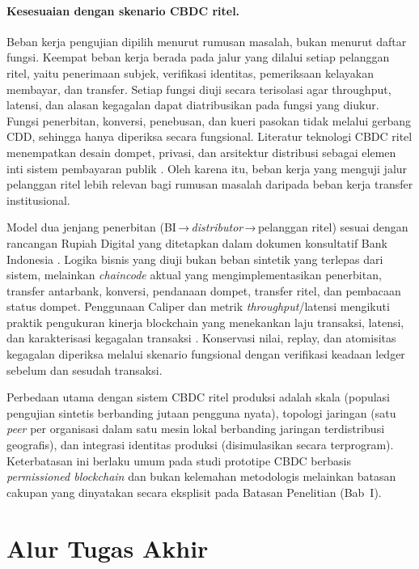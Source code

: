 \paragraph{Kesesuaian dengan skenario CBDC ritel.}
Beban kerja pengujian dipilih menurut rumusan masalah, bukan menurut daftar
fungsi. Keempat beban kerja berada pada jalur yang dilalui setiap pelanggan
ritel, yaitu penerimaan subjek, verifikasi identitas, pemeriksaan kelayakan
membayar, dan transfer. Setiap fungsi diuji secara terisolasi agar throughput,
latensi, dan alasan kegagalan dapat diatribusikan pada fungsi yang diukur.
Fungsi penerbitan, konversi, penebusan, dan kueri pasokan tidak melalui
gerbang CDD, sehingga hanya diperiksa secara fungsional. Literatur teknologi
CBDC ritel menempatkan desain dompet, privasi, dan arsitektur distribusi
sebagai elemen inti sistem pembayaran publik \cite{Auer2020The}. Oleh karena
itu, beban kerja yang menguji jalur pelanggan ritel lebih relevan bagi rumusan
masalah daripada beban kerja transfer institusional.

Model dua jenjang penerbitan (BI\,→\,\textit{distributor}\,→\,pelanggan ritel) sesuai
dengan rancangan Rupiah Digital yang ditetapkan dalam dokumen konsultatif Bank
Indonesia \cite{bi_consultative, bi_garuda_poc}. Logika bisnis yang diuji bukan
beban sintetik yang terlepas dari sistem, melainkan \textit{chaincode} aktual
yang mengimplementasikan penerbitan, transfer antarbank, konversi, pendanaan dompet, transfer ritel, dan pembacaan
status dompet.
Penggunaan Caliper dan metrik \textit{throughput}/latensi mengikuti praktik
pengukuran kinerja blockchain yang menekankan laju transaksi, latensi, dan
karakterisasi kegagalan transaksi \cite{hlf_caliper, hlf_metrics,
fabric_perf2023}. Konservasi nilai, replay, dan atomisitas kegagalan diperiksa
melalui skenario fungsional dengan verifikasi keadaan ledger sebelum dan
sesudah transaksi.

Perbedaan utama dengan sistem CBDC ritel produksi adalah skala (populasi
pengujian sintetis berbanding jutaan pengguna nyata), topologi jaringan (satu
\textit{peer} per organisasi dalam satu mesin lokal berbanding jaringan
terdistribusi geografis), dan integrasi identitas produksi (disimulasikan
secara terprogram). Keterbatasan ini berlaku umum pada studi prototipe CBDC berbasis
\textit{permissioned blockchain} \cite{sethaput2025} dan bukan kelemahan
metodologis melainkan batasan cakupan yang dinyatakan secara eksplisit pada
Batasan Penelitian (Bab~I).

\section{Alur Tugas Akhir}

